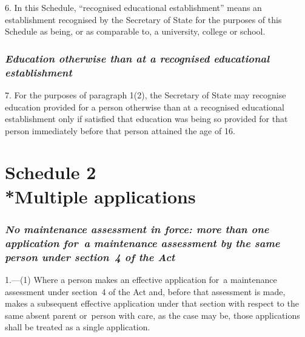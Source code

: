 \documentclass[a4paper,12pt]{article}
\begin{document}
6.  In this Schedule, “recognised educational establishment” means an establishment recognised by the Secretary of State for the purposes of this Schedule as being, or as comparable to, a university, college or school.


\section*{\itshape Education otherwise than at a recognised educational establishment}

7.  For the purposes of paragraph 1(2), the Secretary of State may recognise education provided for a person otherwise than at a recognised educational establishment only if satisfied that education was being so provided for that person immediately before that person attained the age of 16.


\part[Schedule 2 --- Multiple applications]{Schedule 2\\*Multiple applications}

\renewcommand\parthead{--- Schedule 2}

\section*{\itshape No maintenance assessment in force: more than one application for~a maintenance assessment by the same person under section~4 
of the Act}

1.—(1) Where a person makes an effective application for~a maintenance assessment under section~4 
of the Act and, before that assessment is made, makes a subsequent effective application under that section with respect to the same absent parent or~person with care, as the case may be, those applications shall be treated as a single application.
\end{document}
